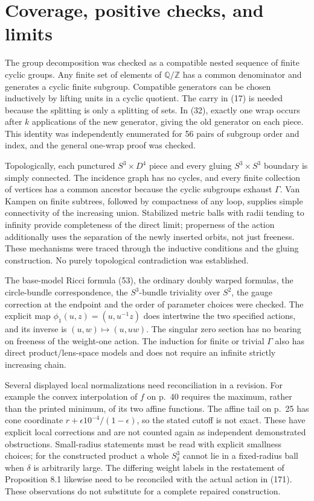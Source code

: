 \documentclass[10pt]{article}
\begin{document}
\section*{Coverage, positive checks, and limits}
The group decomposition was checked as a compatible nested sequence of finite cyclic groups. Any finite set of elements of \(\mathbb Q/\mathbb Z\) has a common denominator and generates a cyclic finite subgroup. Compatible generators can be chosen inductively by lifting units in a cyclic quotient. The carry in (17) is needed because the splitting is only a splitting of sets. In (32), exactly one wrap occurs after \(k\) applications of the new generator, giving the old generator on each piece. This identity was independently enumerated for 56 pairs of subgroup order and index, and the general one-wrap proof was checked.\par
Topologically, each punctured \(S^3\times D^4\) piece and every gluing \(S^3\times S^3\) boundary is simply connected. The incidence graph has no cycles, and every finite collection of vertices has a common ancestor because the cyclic subgroups exhaust \(\Gamma\). Van Kampen on finite subtrees, followed by compactness of any loop, supplies simple connectivity of the increasing union. Stabilized metric balls with radii tending to infinity provide completeness of the direct limit; properness of the action additionally uses the separation of the newly inserted orbits, not just freeness. These mechanisms were traced through the inductive conditions and the gluing construction. No purely topological contradiction was established.\par
The base-model Ricci formula (53), the ordinary doubly warped formulas, the circle-bundle correspondence, the \(S^3\)-bundle triviality over \(S^2\), the gauge correction at the endpoint and the order of parameter choices were checked. The explicit map \(\phi_1(u,z)=(u,u^{-1}z)\) does intertwine the two specified actions, and its inverse is \((u,w)\mapsto(u,uw)\). The singular zero section has no bearing on freeness of the weight-one action. The induction for finite or trivial \(\Gamma\) also has direct product/lens-space models and does not require an infinite strictly increasing chain.\par
Several displayed local normalizations need reconciliation in a revision. For example the convex interpolation of \(f\) on p. 40 requires the maximum, rather than the printed minimum, of its two affine functions. The affine tail on p. 25 has cone coordinate \(r+\epsilon10^{-4}/(1-\epsilon)\), so the stated cutoff is not exact. These have explicit local corrections and are not counted again as independent demonstrated obstructions. Small-radius statements must be read with explicit smallness choices; for the constructed product a whole \(S^3_\delta\) cannot lie in a fixed-radius ball when \(\delta\) is arbitrarily large. The differing weight labels in the restatement of Proposition 8.1 likewise need to be reconciled with the actual action in (171). These observations do not substitute for a complete repaired construction.\par
\end{document}
